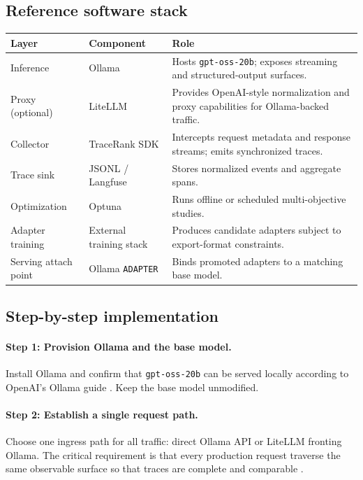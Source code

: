     \subsection{Reference software stack}
    \begin{longtable}{p{3cm}p{4cm}p{7.5cm}}
    \toprule
    \textbf{Layer} & \textbf{Component} & \textbf{Role} \\
    \midrule
    Inference & Ollama & Hosts \texttt{gpt-oss-20b}; exposes streaming and structured-output surfaces. \\
    Proxy (optional) & LiteLLM & Provides OpenAI-style normalization and proxy capabilities for Ollama-backed traffic. \\
    Collector & TraceRank SDK & Intercepts request metadata and response streams; emits synchronized traces. \\
    Trace sink & JSONL / Langfuse & Stores normalized events and aggregate spans. \\
    Optimization & Optuna & Runs offline or scheduled multi-objective studies. \\
    Adapter training & External training stack & Produces candidate adapters subject to export-format constraints. \\
    Serving attach point & Ollama \texttt{ADAPTER} & Binds promoted adapters to a matching base model. \\
    \bottomrule
    \end{longtable}
    
    \subsection{Step-by-step implementation}
    \paragraph{Step 1: Provision Ollama and the base model.}
    Install Ollama and confirm that \texttt{gpt-oss-20b} can be served locally according to OpenAI's Ollama guide \cite{openai_ollama_guide}. Keep the base model unmodified.
    
    \paragraph{Step 2: Establish a single request path.}
    Choose one ingress path for all traffic: direct Ollama API or LiteLLM fronting Ollama. The critical requirement is that every production request traverse the same observable surface so that traces are complete and comparable \cite{litellm_ollama}.
    

